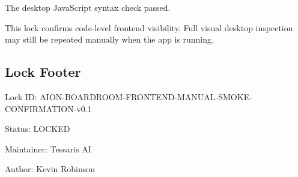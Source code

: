 The desktop JavaScript syntax check passed.

This lock confirms code-level frontend visibility. Full visual desktop inspection may still be repeated manually when the app is running.

\subsection{Lock Footer}

Lock ID: AION-BOARDROOM-FRONTEND-MANUAL-SMOKE-CONFIRMATION-v0.1

Status: LOCKED

Maintainer: Tessaris AI

Author: Kevin Robinson
